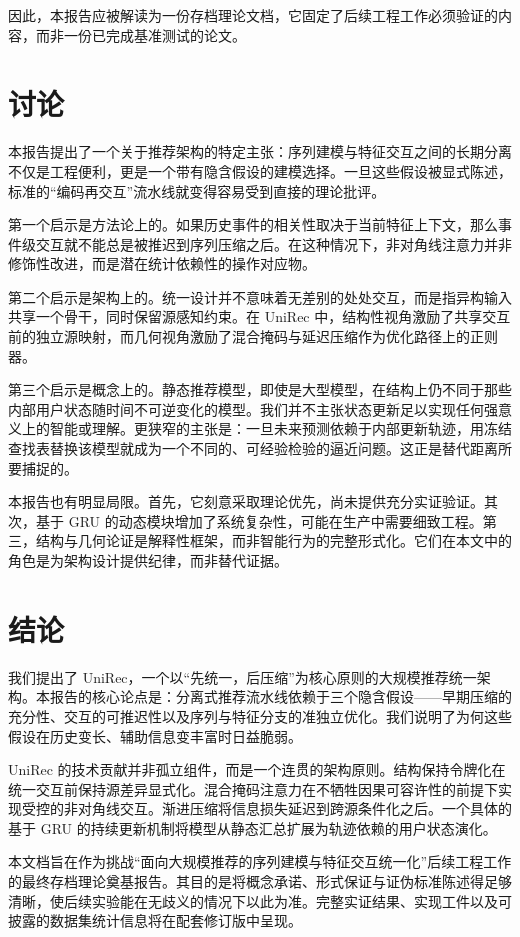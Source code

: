 \documentclass{article}
\begin{document}
因此，本报告应被解读为一份存档理论文档，它固定了后续工程工作必须验证的内容，而非一份已完成基准测试的论文。

\section{讨论}

本报告提出了一个关于推荐架构的特定主张：序列建模与特征交互之间的长期分离不仅是工程便利，更是一个带有隐含假设的建模选择。一旦这些假设被显式陈述，标准的“编码再交互”流水线就变得容易受到直接的理论批评。

第一个启示是方法论上的。如果历史事件的相关性取决于当前特征上下文，那么事件级交互就不能总是被推迟到序列压缩之后。在这种情况下，非对角线注意力并非修饰性改进，而是潜在统计依赖性的操作对应物。

第二个启示是架构上的。统一设计并不意味着无差别的处处交互，而是指异构输入共享一个骨干，同时保留源感知约束。在 UniRec 中，结构性视角激励了共享交互前的独立源映射，而几何视角激励了混合掩码与延迟压缩作为优化路径上的正则器。

第三个启示是概念上的。静态推荐模型，即使是大型模型，在结构上仍不同于那些内部用户状态随时间不可逆变化的模型。我们并不主张状态更新足以实现任何强意义上的智能或理解。更狭窄的主张是：一旦未来预测依赖于内部更新轨迹，用冻结查找表替换该模型就成为一个不同的、可经验检验的逼近问题。这正是替代距离所要捕捉的。

本报告也有明显局限。首先，它刻意采取理论优先，尚未提供充分实证验证。其次，基于 GRU 的动态模块增加了系统复杂性，可能在生产中需要细致工程。第三，结构与几何论证是解释性框架，而非智能行为的完整形式化。它们在本文中的角色是为架构设计提供纪律，而非替代证据。

\section{结论}

我们提出了 UniRec，一个以“先统一，后压缩”为核心原则的大规模推荐统一架构。本报告的核心论点是：分离式推荐流水线依赖于三个隐含假设——早期压缩的充分性、交互的可推迟性以及序列与特征分支的准独立优化。我们说明了为何这些假设在历史变长、辅助信息变丰富时日益脆弱。

UniRec 的技术贡献并非孤立组件，而是一个连贯的架构原则。结构保持令牌化在统一交互前保持源差异显式化。混合掩码注意力在不牺牲因果可容许性的前提下实现受控的非对角线交互。渐进压缩将信息损失延迟到跨源条件化之后。一个具体的基于 GRU 的持续更新机制将模型从静态汇总扩展为轨迹依赖的用户状态演化。

本文档旨在作为挑战“面向大规模推荐的序列建模与特征交互统一化”后续工程工作的最终存档理论奠基报告。其目的是将概念承诺、形式保证与证伪标准陈述得足够清晰，使后续实验能在无歧义的情况下以此为准。完整实证结果、实现工件以及可披露的数据集统计信息将在配套修订版中呈现。
\end{document}
